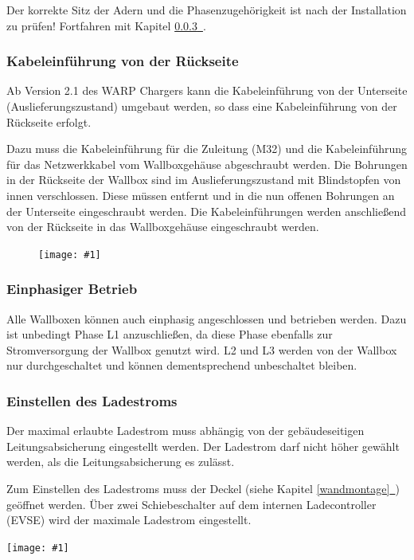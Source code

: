 \documentclass[a4paper,10pt]{article}
\newcommand{\gfx}[1]{\texttt{[image: \#1]}}
\newcommand*{\fullref}[1]{\hyperref[{#1}]{\ref*{#1}~\nameref*{#1}}}
\begin{document}
\begin{multicols*}{2}
	Der korrekte Sitz der Adern und die Phasenzugehörigkeit ist nach der
	Installation zu prüfen! Fortfahren mit Kapitel \fullref{ladestrom_schalter}.

	\subsubsection{Kabeleinführung von der Rückseite}
	Ab Version 2.1 des WARP Chargers kann die Kabel\-einführung von der Unterseite
	(Auslieferungszustand) umgebaut werden, so dass eine Kabeleinführung von der
	Rückseite erfolgt.

	Dazu muss die Kabeleinführung für die Zuleitung (M32) und die
	Kabeleinführung für das Netzwerkkabel vom Wallboxgehäuse abgeschraubt
	werden. Die Bohrungen in der Rückseite der Wallbox sind im
	Auslieferungszustand mit Blindstopfen von innen verschlossen.
	Diese müssen entfernt und in die nun offenen Bohrungen an der Unterseite
	eingeschraubt werden. Die Kabeleinführungen werden anschließend von
	der Rückseite in das Wallboxgehäuse eingeschraubt werden.

	\begin{figure}[H]
		\gfx{./img_warp2/resized/warp2_1_back_wp_ready_1000.jpg}
	\end{figure}

	\subsubsection{Einphasiger Betrieb}
	Alle Wallboxen können auch einphasig angeschlossen und betrieben werden.
	Dazu ist unbedingt Phase L1 anzuschließen, da diese Phase ebenfalls zur
	Stromversorgung der Wallbox genutzt wird. L2 und L3 werden von der Wallbox
	nur durchgeschaltet und können dementsprechend unbeschaltet bleiben.

	\subsubsection{Einstellen des Ladestroms}\label{ladestrom_schalter}
	Der maximal erlaubte Ladestrom muss abhängig von der gebäudeseitigen
	Leitungsabsicherung eingestellt werden. Der Ladestrom darf nicht höher gewählt
	werden, als die Leitungsabsicherung es zulässt.

	Zum Einstellen des Ladestroms muss der Deckel (siehe Kapitel \fullref{wandmontage})
	geöffnet werden. Über zwei Schiebeschalter auf dem internen Ladecontroller (EVSE) wird der
	maximale Ladestrom eingestellt.

	\gfx{./img_warp2/resized/warp2_current_configure_w_caption_600}


\end{multicols*}
\end{document}
